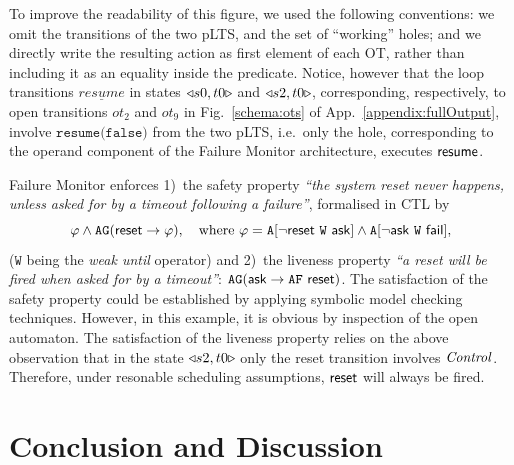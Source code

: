 \documentclass{lncs/llncs}
\newcommand{\TODO}[1]{\textcolor{red}{\textbf{[TODO:#1]}}}
\newcommand{\OTvar}{\texttt}
\newcommand{\ie}[1][\ ]{i.e.#1}
\begin{document}
To improve the readability of this figure, we used the following conventions:
we omit the transitions of the two pLTS, and the set of ``working''
holes; and we directly write the resulting action as first element of
each OT, rather than including it as an equality inside the
predicate.
%
Notice, however that the loop transitions
$\underline{\mathit{resume}}$ in states $\triangleleft{s0,t0}\triangleright$ and
$\triangleleft{s2,t0}\triangleright$, corresponding, respectively, to open transitions
$ot_2$ and $ot_9$ in Fig.~\ref{schema:ots} of
App.~\ref{appendix:fullOutput}, involve $\OTvar{resume(false)}$ from
the two pLTS, \ie only the hole, corresponding to the operand
component of the Failure Monitor architecture, executes $\mathsf{resume}$.

Failure Monitor enforces 1)~the safety property \emph{``the
  system reset never happens, unless asked for by a timeout
  following a failure''}, formalised in CTL by
%
\[
\varphi \land \mathtt{AG} (\PortReset \rightarrow \varphi),
\quad\text{where}\
%
\varphi = \mathtt{A} [\lnot \PortReset\ \mathtt{W}\ \PortAsk]
\land \mathtt{A} [\lnot \PortAsk\ \mathtt{W}\ \PortFail],
\]
%
($\mathtt{W}$ being the \emph{weak until} operator) and 2)~the
liveness property \emph{``a reset will be fired when asked for by
  a timeout''}:
%
$\mathtt{AG}(\mathsf{ask} \rightarrow \mathtt{AF}\ \mathsf{reset})$.
%
The satisfaction of the safety property could be established by
applying symbolic model checking techniques.  However, in this
example, it is obvious by inspection of the open automaton.  The
satisfaction of the liveness property relies on the above observation
that in the state $\triangleleft{s2,t0}\triangleright$ only the reset transition involves
$\mathit{Control}$.  Therefore, under resonable scheduling assumptions,
$\mathsf{reset}$ will always be fired.




\section{Conclusion and Discussion}
\label{section:conclusion}
\end{document}
